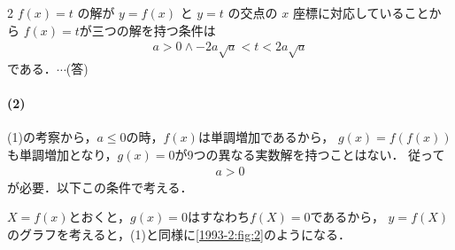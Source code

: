 \documentclass[../../main.tex]{subfiles}
\begin{document}
\begin{multicols}{2}
  $f(x)=t$ の解が $y=f(x)$ と $y=t$ の交点の $x$ 座標に対応していることから
  $f(x)=t$が三つの解を持つ条件は
  \begin{align}
    a>0 \land -2a\sqrt{a} < t < 2a\sqrt{a}
  \end{align}
  である．$\cdots$(答)

  \paragraph{(2)}
  (1)の考察から，$a \le 0$の時，$f(x)$は単調増加であるから，
  $g(x) = f(f(x))$も単調増加となり，$g(x)=0$が9つの異なる実数解を持つことはない．
  従って
  \begin{align}
    a > 0
  \end{align}
  が必要．以下この条件で考える．

  $X=f(x)$とおくと，$g(x)=0$はすなわち$f(X)=0$であるから，
  $y=f(X)$のグラフを考えると，(1)と同様に\cref{1993-2:fig:2}のようになる．


\end{multicols}
\end{document}
